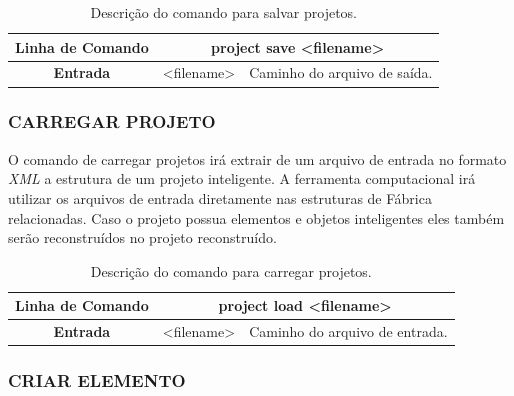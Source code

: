 \documentclass[a4paper,12pt]{monografia}
\theoremstyle{plain}
\theoremstyle{definition}
\theoremstyle{remark}
\begin{document}
\begin{center}
	\begin{table}[!htbp]
		\begin{tabular}{|c|c|m{}|}
			\hline
			\textbf{Linha de Comando} & \multicolumn{2}{c|}{project save <file\underline{\space\space}name>} \\
			\hline
			\textbf{Entrada} & <file\underline{\space\space}name> & Caminho do arquivo de saída. \\
			\hline
		\end{tabular}
		\caption{Descrição do comando para salvar projetos.}
		\label{tab:save_project}
	\end{table}
\end{center}

\subsubsection{CARREGAR PROJETO}\label{sec:load_projects}

O comando de carregar projetos irá extrair de um arquivo de entrada no formato \textit{XML} a estrutura de um projeto inteligente. A ferramenta computacional irá utilizar os arquivos de entrada diretamente nas estruturas de Fábrica relacionadas. Caso o projeto possua elementos e objetos inteligentes eles também serão reconstruídos no projeto reconstruído.
 
\begin{center}
	\begin{table}[!htbp]
		\begin{tabular}{|c|c|m{}|}
			\hline
			\textbf{Linha de Comando} & \multicolumn{2}{c|}{project load <filename>} \\
			\hline
			\textbf{Entrada} & <filename> & Caminho do arquivo de entrada. \\
			\hline
		\end{tabular}
		\caption{Descrição do comando para carregar projetos.}
		\label{tab:load_project}
	\end{table}
\end{center}

\subsubsection{CRIAR ELEMENTO}\label{sec:create_element}
\end{document}
